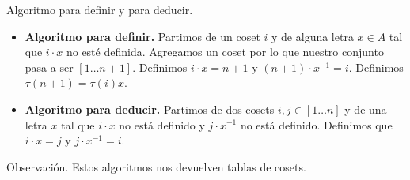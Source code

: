 \documentclass[aspectratio=169, 9pt]{beamer}
\newcommand{\rep}{\textsc{rep}}
\newcommand{\In}{[1 \dots n]}
\newcommand{\Co}{{\cal{C}}}
\begin{document}
\begin{frame}[fragile]{Algoritmo para definir y para deducir.}
	\begin{itemize}
		\item \textbf{Algoritmo para definir.} 
		Partimos de un coset $i$ y de alguna letra $x \in A$ tal que $i \cdot x$ no esté definida.
		Agregamos un coset por lo que nuestro conjunto pasa a ser $[1 \dots n+1]$. 
		Definimos $i \cdot x = n+1$ y $(n+1) \cdot x^{-1} = i$.
		Definimos $\tau(n+1) = \tau (i) x$.
		\item \textbf{Algoritmo para deducir.} Partimos de dos cosets $i,j \in \In$ y de una letra $x$ tal que $i \cdot x$ no está definido y $j \cdot x^{-1}$ no está definido.
		Definimos que $i \cdot x = j$ y $j \cdot x^{-1} = i$.
	\end{itemize}
	
	

	\begin{alertblock}{Observación.}
		Estos algoritmos nos devuelven tablas de cosets.
	\end{alertblock}
	

\end{frame}






%	
%	
%	
%
%
%		
\end{document}
